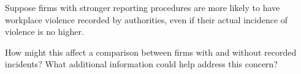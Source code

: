 \documentclass[12pt]{article}
\begin{document}
\begin{enumerate}
Suppose firms with stronger reporting procedures
are more likely to have workplace violence
recorded by authorities, even if their actual
incidence of violence is no higher.

How might this affect a comparison between
firms with and without recorded incidents?
What additional information could help
address this concern?

\vspace{4cm}

\end{enumerate}
\end{document}
